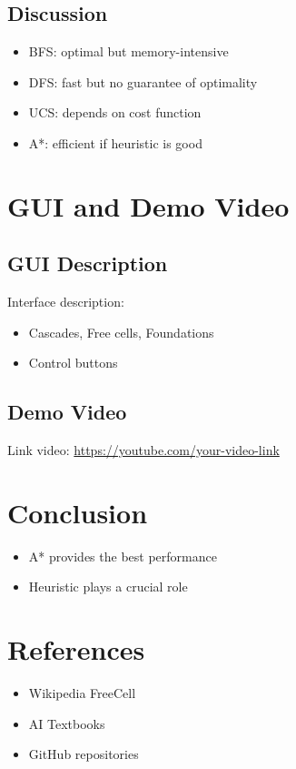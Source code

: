 \documentclass[12pt,a4paper]{article}
\begin{document}
\subsection{Discussion}
\begin{itemize}
    \item BFS: optimal but memory-intensive
    \item DFS: fast but no guarantee of optimality
    \item UCS: depends on cost function
    \item A*: efficient if heuristic is good
\end{itemize}

\section{GUI and Demo Video}

\subsection{GUI Description}
Interface description:
\begin{itemize}
    \item Cascades, Free cells, Foundations
    \item Control buttons
\end{itemize}

\subsection{Demo Video}
Link video:
\url{https://youtube.com/your-video-link}

\section{Conclusion}
\begin{itemize}
    \item A* provides the best performance
    \item Heuristic plays a crucial role
\end{itemize}

\section{References}
\begin{itemize}
    \item Wikipedia FreeCell
    \item AI Textbooks
    \item GitHub repositories
\end{itemize}
\end{document}
